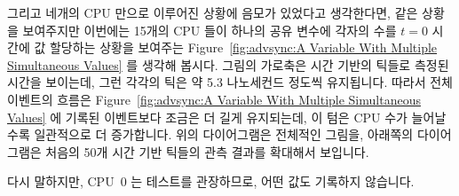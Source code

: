 그리고 네개의 CPU 만으로 이루어진 상황에 음모가 있었다고 생각한다면,
같은 상황을 보여주지만 이번에는 15개의 CPU 들이 하나의 공유 변수에 각자의 수를
$t=0$ 시간에 값 할당하는 상황을 보여주는
Figure~\ref{fig:advsync:A Variable With Multiple Simultaneous Values} 를 생각해
봅시다.
그림의 가로축은 시간 기반의 틱들로 측정된 시간을 보이는데, 그런 각각의 틱은
약 5.3 나노세컨드 정도씩 유지됩니다.
따라서 전체 이벤트의 흐름은
Figure~\ref{fig:advsync:A Variable With Multiple Simultaneous Values} 에 기록된
이벤트보다 조금은 더 길게 유지되는데, 이 텀은 CPU 수가 늘어날수록 일관적으로 더
증가합니다.
위의 다이어그램은 전체적인 그림을, 아래쪽의 다이어그램은 처음의 50개 시간 기반
틱들의 관측 결과를 확대해서 보입니다.

다시 말하지만, CPU~0 는 테스트를 관장하므로, 어떤 값도 기록하지 않습니다.

